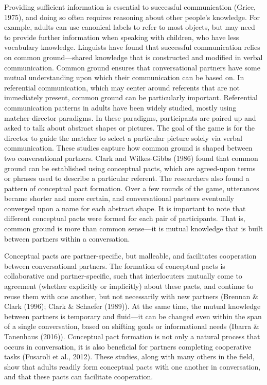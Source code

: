 \documentclass[10pt, letterpaper]{article}
\begin{document}
Providing sufficient information is essential to successful
communication (Grice, 1975), and doing so often requires reasoning about
other people's knowledge. For example, adults can use canonical labels
to refer to most objects, but may need to provide further information
when speaking with children, who have less vocabulary knowledge.
Linguists have found that successful communication relies on common
ground---shared knowledge that is constructed and modified in verbal
communication. Common ground ensures that conversational partners have
some mutual understanding upon which their communication can be based
on. In referential communication, which may center around referents that
are not immediately present, common ground can be particularly
important. Referential communication patterns in adults have been widely
studied, mostly using matcher-director paradigms. In these paradigms,
participants are paired up and asked to talk about abstract shapes or
pictures. The goal of the game is for the director to guide the matcher
to select a particular picture solely via verbal communication. These
studies capture how common ground is shaped between two conversational
partners. Clark and Wilkes-Gibbs (1986) found that common ground can be
established using conceptual pacts, which are agreed-upon terms or
phrases used to describe a particular referent. The researchers also
found a pattern of conceptual pact formation. Over a few rounds of the
game, utterances became shorter and more certain, and conversational
partners eventually converged upon a name for each abstract shape. It is
important to note that different conceptual pacts were formed for each
pair of participants. That is, common ground is more than common
sense---it is mutual knowledge that is built between partners within a
conversation.

Conceptual pacts are partner-specific, but malleable, and facilitates
cooperation between conversational partners. The formation of conceptual
pacts is collaborative and partner-specific, such that interlocuters
mutually come to agreement (whether explicitly or implicitly) about
these pacts, and continue to reuse them with one another, but not
necessarily with new partners (Brennan \& Clark (1996); Clark \&
Schaefer (1989)). At the same time, the mutual knowledge between
partners is temporary and fluid---it can be changed even within the span
of a single conversation, based on shifting goals or informational needs
(Ibarra \& Tanenhaus (2016)). Conceptual pact formation is not only a
natural process that occurs in conversation, it is also beneficial for
partners completing cooperative tasks (Fusaroli et al., 2012). These
studies, along with many others in the field, show that adults readily
form conceptual pacts with one another in conversation, and that these
pacts can facilitate cooperation.
\end{document}
